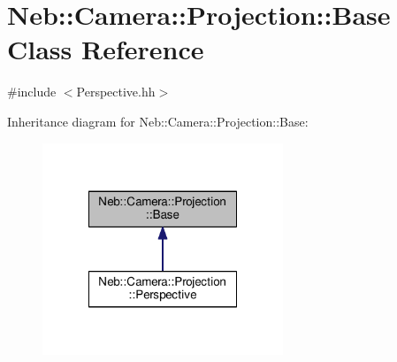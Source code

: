 \hypertarget{classNeb_1_1Camera_1_1Projection_1_1Base}{\section{Neb\-:\-:Camera\-:\-:Projection\-:\-:Base Class Reference}
\label{classNeb_1_1Camera_1_1Projection_1_1Base}
}


 




{\ttfamily \#include $<$Perspective.\-hh$>$}



Inheritance diagram for Neb\-:\-:Camera\-:\-:Projection\-:\-:Base\-:
\nopagebreak
\begin{figure}[H]
\begin{center}
\leavevmode
\includegraphics[width=204pt]{classNeb_1_1Camera_1_1Projection_1_1Base__inherit__graph}
\end{center}
\end{figure}

